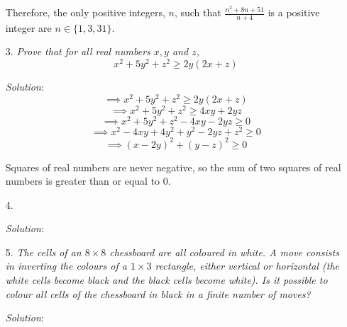 \documentclass{article}
\begin{document}
\begin{enumerate}[1.]
Therefore, the only positive integers, $n$, such that $\frac{n^2 + 8n + 51}{n + 4}$ is a positive integer are $n \in \{1, 3, 31\}.$


\item[3.] %
\textit{Prove that for all real numbers $x, y$ and $z$,
$$x^2 + 5y^2 + z^2 \ge 2y(2x + z)$$}

\textit{Solution}:
$$\implies x^2 + 5y^2 + z^2 \ge 2y(2x + z)$$
$$\implies x^2 + 5y^2 + z^2 \ge 4xy + 2yz$$
$$\implies x^2 + 5y^2 + z^2 - 4xy - 2yz \ge 0$$
$$\implies x^2 - 4xy + 4y^2 + y^2 - 2yz + z^2 \ge 0$$
$$\implies (x - 2y)^2 + (y - z)^2 \ge 0$$

Squares of real numbers are never negative, so the sum of two squares of real numbers is greater than or equal to 0.



\item[4.] %
\textit{}

\textit{Solution}:


\item[5.] %
\textit{The cells of an $8 \times 8$ chessboard are all coloured in white. A move consists in inverting the colours of a $1 \times 3$ rectangle, either vertical or horizontal (the white cells become black and the black cells become white).
Is it possible to colour all cells of the chessboard in black in a finite number of moves?}

\textit{Solution}: 


\end{enumerate}
\end{document}
